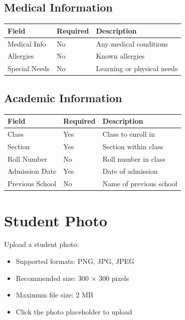 \documentclass[12pt,a4paper]{report}
\begin{document}
\subsection{Medical Information}

\begin{longtable}{@{}p{4cm}p{3cm}p{6cm}@{}}
\toprule
\textbf{Field} & \textbf{Required} & \textbf{Description} \\
\midrule
\endhead
Medical Info & No & Any medical conditions \\
Allergies & No & Known allergies \\
Special Needs & No & Learning or physical needs \\
\bottomrule
\end{longtable}

\subsection{Academic Information}

\begin{longtable}{@{}p{4cm}p{3cm}p{6cm}@{}}
\toprule
\textbf{Field} & \textbf{Required} & \textbf{Description} \\
\midrule
\endhead
Class & Yes & Class to enroll in \\
Section & Yes & Section within class \\
Roll Number & No & Roll number in class \\
Admission Date & Yes & Date of admission \\
Previous School & No & Name of previous school \\
\bottomrule
\end{longtable}

\section{Student Photo}

Upload a student photo:
\begin{itemize}[leftmargin=*]
    \item Supported formats: PNG, JPG, JPEG
    \item Recommended size: 300 × 300 pixels
    \item Maximum file size: 2 MB
    \item Click the photo placeholder to upload
\end{itemize}

\end{document}
